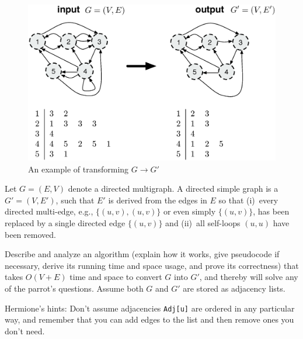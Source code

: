 \documentclass[12pt]{article}
\begin{document}
\begin{enumerate}
\begin{figure}[h!]
\begin{center}
\includegraphics[scale=0.5]{adjacency_list.eps} \\
An example of transforming $G\to G'$
\end{center}
\label{fig:adjlist}
\end{figure}
	
Let $G=(E,V)$ denote a directed multigraph. A directed simple graph is a
$G'=(V,E')$, such that $E'$ is derived from the edges in $E$ so that (i)~every
directed multi-edge, e.g., $\{(u,v),(u,v)\}$ or even simply $\{(u,v)\}$, has
been replaced by a single directed edge $\{(u,v)\}$ and (ii)~all self-loops
$(u,u)$ have been removed.\\
\pagebreak

Describe and analyze an algorithm (explain how it works, give pseudocode if
necessary, derive its running time and space usage, and prove its correctness)
that takes \mbox{$O(V+E)$} time and space to convert $G$ into $G'$, and thereby
will solve any of the parrot's questions. Assume both $G$ and $G'$ are stored
as adjacency lists.
	
Hermione's hints: Don't assume adjacencies {\tt Adj[u]} are ordered in any
particular way, and remember that you can add edges to the list and then remove
ones you don't need.\\
\pagebreak

\end{enumerate}
\end{document}

